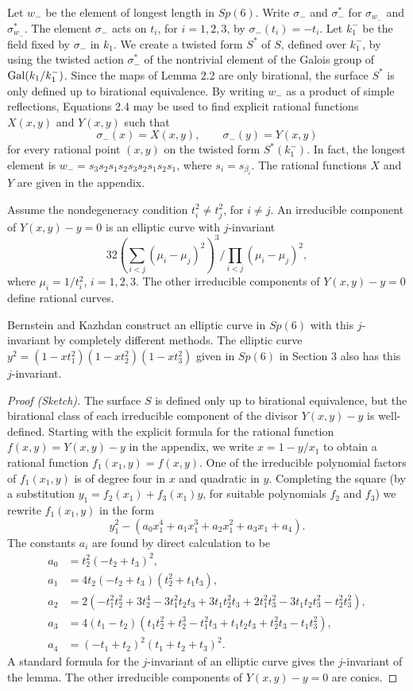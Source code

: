 \documentclass{amsart}
\begin{document}
Let $w_-$ be the element of longest length in $Sp(6)$. 
Write $\sigma_-$ and $\sigma_-^*$ for $\sigma_{w_-}$ and
$\sigma^*_{w_-}$.
The element $\sigma_-$  acts on $t_i$,
for $i=1,2,3$, by $\sigma_{-}(t_i) = -t_i$.  Let $k_1^-$ be the
field fixed by $\sigma_{-}$ in $k_1$.  We create a twisted form
$S^*$ of $S$, defined over $k^-_1$, by using the twisted action $\sigma_{-}^*$
of the nontrivial element of the 
Galois group of $\operatorname{Gal}(k_1/k_1^-)$.  
Since the maps of  Lemma 2.2 are only birational, the surface
$S^*$ is only defined up to birational equivalence.
By writing $w_-$ as a product of simple reflections,
Equations 2.4 may be used to
find explicit rational functions $X(x,y)$ and $Y(x,y)$ such that
$$\sigma_{-}(x) = X(x,y),\qquad \sigma_{-}(y) = Y(x,y)$$
for every rational point $(x,y)$ on the twisted form $S^*(k_1^-)$.
In fact, the longest element is $w_- = s_3s_2s_1s_2s_3s_2s_1s_2s_1$,
where $s_i = s_{\beta_i}$.
The rational functions $X$ and $Y$ are given in the appendix.

 Assume the nondegeneracy condition $t_i^2\ne t_j^2$,
for $i\ne j$. An irreducible component of $Y(x,y) - y=0$ is an elliptic
curve with $j$-invariant
$$32 \left( \sum_{i<j} (\mu_i-\mu_j)^2\right)^3/\prod_{i<j} (\mu_i-\mu_j)^2,$$
where $\mu_i = 1/t_i^2$, $i=1,2,3$.  The other irreducible components
of $Y(x,y)-y = 0$
define rational curves.
\endproclaim

Bernstein and Kazhdan construct an elliptic curve
in $Sp(6)$ with this $j$-invariant by completely different methods.
The elliptic curve $y^2 = (1-x t_1^2 )(1-x t_2^2 )(1-x t_3^2)$ given
in $Sp(6)$ in Section 3 also has this $j$-invariant.

\begin{proof}[Proof (Sketch)]  The surface $S$ is
defined only up to birational equivalence, but the birational class of each
irreducible component 
of the divisor $Y(x,y)-y$ is well-defined.
  Starting with the explicit formula for the
rational function $f(x,y) = Y(x,y) - y$ in the appendix, we write
$x = 1 - y/x_1$ to obtain a rational function $f_1(x_1,y) = f(x,y)$.
One of the irreducible polynomial factors of $f_1(x_1,y)$ is 
of degree four in $x$ and quadratic
in $y$.  Completing the square (by a substitution $y_1 = f_2(x_1) + f_3(x_1) y$,
for suitable polynomials $f_2$ and $f_3$) we rewrite $f_1(x_1,y)$ in the
form
$$y_1^2 - (a_0 x_1^4 + a_1 x_1^3 + a_2 x_1^2 + a_3 x_1 + a_4).$$
The constants $a_i$ are found by direct calculation to be
\begin{align*}
a_0 &= t_2^2 (-t_2 + t_3)^2,\\
a_1 &= 4 t_2 (-t_2 + t_3) (t_2^2 + t_1 t_3),\\
a_2 &= 2 (-t_1^2 t_2^2 + 3 t_2^4 - 3 t_1^2 t_2 t_3 + 3 t_1 t_2^2 t_3
           + 2 t_1^2 t_3^2 - 3 t_1 t_2 t_3^2 - t_2^2 t_3^2),\\
a_3 &= 4 (t_1-t_2)(t_1 t_2^2 + t_2^3 - t_1^2 t_3 + t_1 t_2 t_3 + t_2^2 t_3
       - t_1 t_3^2),\\
a_4 &= (-t_1+t_2)^2 (t_1+t_2+t_3)^2.
\end{align*}
A standard formula for the $j$-invariant of an elliptic curve gives
the $j$-invariant of the lemma.   
The other irreducible components of $Y(x,y) - y=0$ are
conics.
\end{proof}
\end{document}
